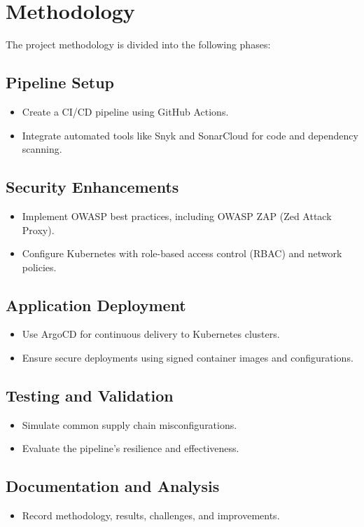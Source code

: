 \documentclass[conference]{IEEEtran}
\begin{document}
\section{Methodology}
The project methodology is divided into the following phases:

\subsection{Pipeline Setup}
\begin{itemize}
    \item Create a CI/CD pipeline using GitHub Actions.
    \item Integrate automated tools like Snyk and SonarCloud for code and dependency scanning.
\end{itemize}

\subsection{Security Enhancements}
\begin{itemize}
    \item Implement OWASP best practices, including OWASP ZAP (Zed Attack Proxy).
    \item Configure Kubernetes with role-based access control (RBAC) and network policies.
\end{itemize}

\subsection{Application Deployment}
\begin{itemize}
    \item Use ArgoCD for continuous delivery to Kubernetes clusters.
    \item Ensure secure deployments using signed container images and configurations.
\end{itemize}

\subsection{Testing and Validation}
\begin{itemize}
    \item Simulate common supply chain misconfigurations.
    \item Evaluate the pipeline's resilience and effectiveness.
\end{itemize}

\subsection{Documentation and Analysis}
\begin{itemize}
    \item Record methodology, results, challenges, and improvements.
\end{itemize}
\end{document}
